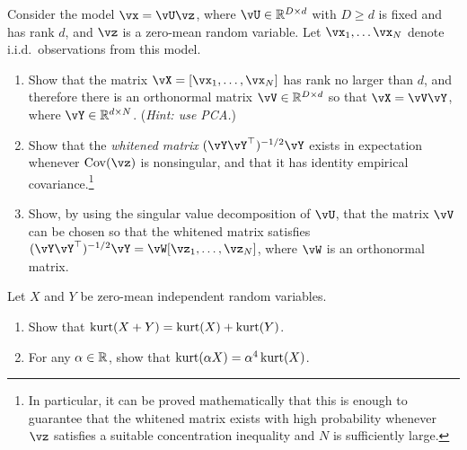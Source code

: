 \documentclass[../../book-main.tex]{subfiles}
\begin{document}
\begin{exercise}\label{exercise:whitening}
    Consider the model $\vx = \vU \vz$, where $\vU \in \R^{D \times d}$ with $D \geq d$ is fixed and has rank $d$, and $\vz$ is a zero-mean random variable. Let $\vx_1, \dots \vx_N$ denote i.i.d.\ observations from this model.
    \begin{enumerate}
        \item Show that the matrix $\vX = [\vx_1, \dots, \vx_N]$ has rank no larger than $d$, and therefore there is an orthonormal matrix $\vV \in \R^{D \times d}$ so that $\vX = \vV \vY$, where $\vY \in \R^{d \times N}$. (\textit{Hint: use PCA.})
        \item Show that the \textit{whitened matrix} $(\vY \vY^\top)^{-1/2}\vY$ exists in expectation whenever $\Cov(\vz)$ is nonsingular, and that it has identity empirical covariance.\footnote{In particular, it can be proved mathematically that this is enough to guarantee that the whitened matrix exists with high probability whenever $\vz$ satisfies a suitable concentration inequality and $N$ is sufficiently large.}
        \item Show, by using the singular value decomposition of $\vU$, that the matrix $\vV$ can be chosen so that the whitened matrix satisfies $(\vY \vY^\top)^{-1/2} \vY = \vW [\vz_1, \dots, \vz_N]$, where $\vW$ is an orthonormal matrix.
    \end{enumerate}
\end{exercise}

\begin{exercise}\label{exercise:kurtosis-linearity-properties}
    Let $X$ and $Y$ be zero-mean independent random variables.
    \begin{enumerate}
        \item Show that $\mathop{\mathrm{kurt}}(X + Y) = \mathop{\mathrm{kurt}}(X) + \mathop{\mathrm{kurt}}(Y)$.
        \item For any $\alpha \in \mathbb{R}$, show that $\mathop{\mathrm{kurt}}(\alpha X) = \alpha^4 \mathop{\mathrm{kurt}}(X)$.
    \end{enumerate}
\end{exercise}
\end{document}
